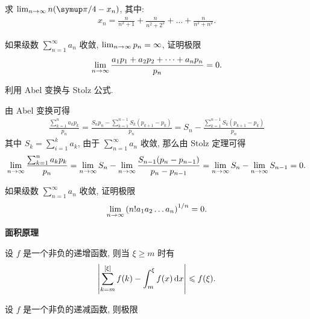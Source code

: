 \begin{exercise}[series=exer]
    \item 求 $ \limit{n}{\infty} n \qty(\pi/4 - x_{n}) $, 其中:
    \begin{align*}
        x_{n} = \frac{n}{n^{2} + 1} + \frac{n}{n^{2} + 2^{2}} + \dots + \frac{n}{n^{2} + n^{2}}.
    \end{align*}
    \item 如果级数 $ \sum_{n = 1}^{\infty} a_{n} $ 收敛, $ \lim_{n \to \infty} p_{n} = \infty $, 证明极限
    \begin{align*}
        \lim_{n \to \infty}\frac{a_{1} p_{1} + a_{2} p_{2} + \dots + a_{n} p_{n}}{p_{n}} = 0.
    \end{align*}
    \begin{hint}
        利用 Abel 变换与 Stolz 公式. 
    \end{hint}
    \begin{answer}
        由 Abel 变换可得
        \begin{align*}
            \frac{\sum_{k = 1}^{n} a_{k}p_{k}}{p_{n}} = \frac{S_{n}p_{n} - \sum_{k = 1}^{n - 1}S_{k}(p_{k + 1} - p_{k})}{p_{n}} = S_{n} - \frac{\sum_{k = 1}^{n - 1}S_{k}(p_{k + 1} - p_{k})}{p_{n}}
        \end{align*}
        其中 $ S_{k} = \sum_{i = 1}^{k}a_{k} $, 由于 $ \sum_{n = 1}^{\infty}a_{n} $ 收敛, 那么由 Stolz 定理可得
        \begin{align*}
            \lim_{n \to \infty}\frac{\sum_{k = 1}^{n} a_{k}p_{k}}{p_{n}} = \lim_{n \to \infty}S_{n} - \lim_{n \to \infty}\frac{S_{n - 1}(p_{n} - p_{n - 1})}{p_{n} - p_{n - 1}} = \lim_{n \to \infty}S_{n} - \lim_{n \to \infty}S_{n - 1} = 0.
        \end{align*}
    \end{answer}
    \item 如果级数 $ \sum_{n = 1}^{\infty} a_{n} $ 收敛, 证明极限
    \begin{align*}
        \lim_{n \to \infty}\qty(n! a_{1} a_{2} \dots a_{n})^{1/n} = 0.
    \end{align*}
    \item \textbf{面积原理}
    \begin{exercise}
        \item 设 $ f $ 是一个非负的递增函数, 则当 $ \xi \ge m $ 时有
        \begin{align*}
            \abs{\sum_{k = m}^{[\xi]} f(k) - \int_{m}^{\xi} f(x) \dd{x}} \leqslant f(\xi).
        \end{align*}
        \item 设 $ f $ 是一个非负的递减函数, 则极限
        \begin{align*}

\end{align*}
\end{exercise}
\end{exercise}
